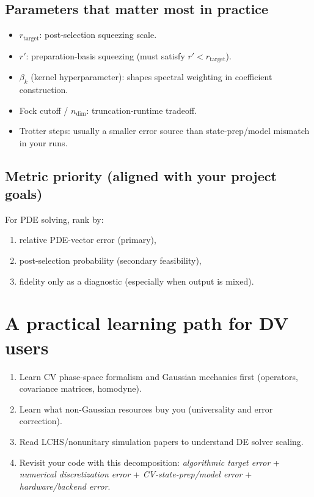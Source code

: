 \documentclass[11pt]{article}
\begin{document}
\subsection{Parameters that matter most in practice}
\begin{itemize}
\item $r_{\text{target}}$: post-selection squeezing scale.
\item $r'$: preparation-basis squeezing (must satisfy $r'<r_{\text{target}}$).
\item $\beta_k$ (kernel hyperparameter): shapes spectral weighting in coefficient construction.
\item Fock cutoff / $n_{\text{dim}}$: truncation-runtime tradeoff.
\item Trotter steps: usually a smaller error source than state-prep/model mismatch in your runs.
\end{itemize}

\subsection{Metric priority (aligned with your project goals)}
For PDE solving, rank by:
\begin{enumerate}
\item relative PDE-vector error (primary),
\item post-selection probability (secondary feasibility),
\item fidelity only as a diagnostic (especially when output is mixed).
\end{enumerate}

\section{A practical learning path for DV users}
\begin{enumerate}
\item Learn CV phase-space formalism and Gaussian mechanics first (operators, covariance matrices, homodyne).
\item Learn what non-Gaussian resources buy you (universality and error correction).
\item Read LCHS/nonunitary simulation papers to understand DE solver scaling.
\item Revisit your code with this decomposition: \textit{algorithmic target error} + \textit{numerical discretization error} + \textit{CV-state-prep/model error} + \textit{hardware/backend error}.
\end{enumerate}
\end{document}
